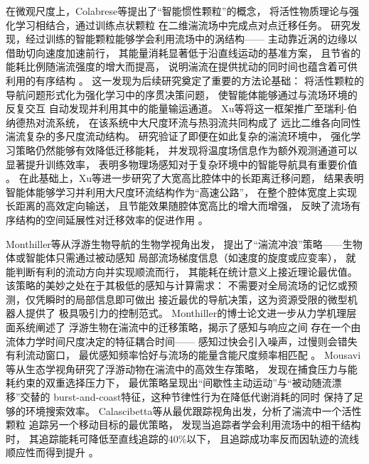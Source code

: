 在微观尺度上，Colabrese等提出了“智能惯性颗粒”的概念，
将活性物质理论与强化学习相结合，通过训练点状颗粒
在二维湍流场中完成点对点迁移任务。
研究发现，经过训练的智能颗粒能够学会利用流场中的涡结构——
主动靠近涡的边缘以借助切向速度加速前行，
其能量消耗显著低于沿直线运动的基准方案，
且节省的能耗比例随湍流强度的增大而提高，
说明湍流在提供扰动的同时间也蕴含着可供利用的有序结构
\cite{colabreseSmartInertialParticles2018a}。
这一发现为后续研究奠定了重要的方法论基础：
将活性颗粒的导航问题形式化为强化学习中的序贯决策问题，
使智能体能够通过与流场环境的反复交互
自动发现并利用其中的能量输运通道。
Xu等将这一框架推广至瑞利-伯纳德热对流系统，
在该系统中大尺度环流与热羽流共同构成了
远比二维各向同性湍流复杂的多尺度流动结构。
研究验证了即便在如此复杂的湍流环境中，
强化学习策略仍然能够有效降低迁移能耗，
并发现将温度场信息作为额外观测通道可以显著提升训练效率，
表明多物理场感知对于复杂环境中的智能导航具有重要价值
\cite{xuMigrationSelfpropellingAgent2022}。
在此基础上，Xu等进一步研究了大宽高比腔体中的长距离迁移问题，
结果表明智能体能够学习并利用大尺度环流结构作为“高速公路”，
在整个腔体宽度上实现长距离的高效定向输送，
且节能效果随腔体宽高比的增大而增强，
反映了流场有序结构的空间延展性对迁移效率的促进作用
\cite{xuLongdistanceMigrationMinimal2023}。

Monthiller等从浮游生物导航的生物学视角出发，
提出了“湍流冲浪”策略——生物体或智能体只需通过被动感知
局部流场梯度信息（如速度的旋度或应变率），
就能判断有利的流动方向并实现顺流而行，
其能耗在统计意义上接近理论最优值。
该策略的美妙之处在于其极低的感知与计算需求：
不需要对全局流场的记忆或预测，仅凭瞬时的局部信息即可做出
接近最优的导航决策，这为资源受限的微型机器人提供了
极具吸引力的控制范式\cite{monthillerSurfingTurbulenceStrategy2022}。
Monthiller的博士论文进一步从力学机理层面系统阐述了
浮游生物在湍流中的迁移策略，揭示了感知与响应之间
存在一个由流体力学时间尺度决定的特征耦合时间——
感知过快会引入噪声，过慢则会错失有利流动窗口，
最优感知频率恰好与流场的能量含能尺度频率相匹配
\cite{monthillerMechanisticApproachPlankton2022a}。
Mousavi等从生态学视角研究了浮游动物在湍流中的高效生存策略，
发现在捕食压力与能耗约束的双重选择压力下，
最优策略呈现出“间歇性主动运动”与“被动随流漂移”交替的
burst-and-coast特征，这种节律性行为在降低代谢消耗的同时
保持了足够的环境搜索效率\cite{mousaviEfficientSurvivalStrategy2024a}。
Calascibetta等从最优跟踪视角出发，分析了湍流中一个活性颗粒
追踪另一个移动目标的最优策略，
发现当追踪者学会利用流场中的相干结构时，
其追踪能耗可降低至直线追踪的40\%以下，
且追踪成功率反而因轨迹的流线顺应性而得到提升
\cite{calascibettaOptimalTrackingStrategies2023}。

